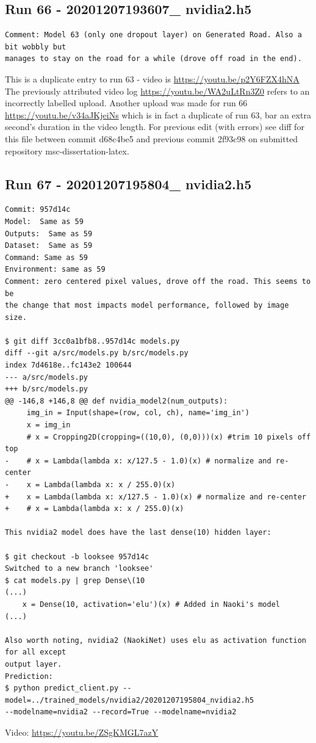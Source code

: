 \subsection{Run 66 - 20201207193607\_ nvidia2.h5}
\label{app_res:65}
\begin{verbatim}
Comment: Model 63 (only one dropout layer) on Generated Road. Also a bit wobbly but
manages to stay on the road for a while (drove off road in the end).
\end{verbatim}
This is a duplicate entry to run 63 - video is \url{https://youtu.be/p2Y6FZX4hNA}
The previously attributed video log \url{https://youtu.be/WA2uLtRn3Z0} refers to an incorrectly labelled upload. 
Another upload was made for run 66 \url{https://youtu.be/v34aJKjeiNs} which is in fact a duplicate of run 63, bar an extra second's duration in the video length.
For previous edit (with errors) see diff for this file  between commit d68c4be5 and previous commit 2f93c98 on submitted repository msc-dissertation-latex.

\subsection{Run 67 - 20201207195804\_ nvidia2.h5}
\label{app_res:XX}
\begin{verbatim}
Commit: 957d14c
Model:  Same as 59
Outputs:  Same as 59
Dataset:  Same as 59
Command: Same as 59
Environment: same as 59 
Comment: zero centered pixel values, drove off the road. This seems to be
the change that most impacts model performance, followed by image size.

$ git diff 3cc0a1bfb8..957d14c models.py
diff --git a/src/models.py b/src/models.py
index 7d4618e..fc143e2 100644
--- a/src/models.py
+++ b/src/models.py
@@ -146,8 +146,8 @@ def nvidia_model2(num_outputs):
     img_in = Input(shape=(row, col, ch), name='img_in')
     x = img_in
     # x = Cropping2D(cropping=((10,0), (0,0)))(x) #trim 10 pixels off top
-    # x = Lambda(lambda x: x/127.5 - 1.0)(x) # normalize and re-center
-    x = Lambda(lambda x: x / 255.0)(x)
+    x = Lambda(lambda x: x/127.5 - 1.0)(x) # normalize and re-center
+    # x = Lambda(lambda x: x / 255.0)(x)

This nvidia2 model does have the last dense(10) hidden layer:

$ git checkout -b looksee 957d14c
Switched to a new branch 'looksee'
$ cat models.py | grep Dense\(10
(...)
    x = Dense(10, activation='elu')(x) # Added in Naoki's model
(...)

Also worth noting, nvidia2 (NaokiNet) uses elu as activation function for all except
output layer.
Prediction:
$ python predict_client.py --model=../trained_models/nvidia2/20201207195804_nvidia2.h5
--modelname=nvidia2 --record=True --modelname=nvidia2

\end{verbatim}
Video: \url{https://youtu.be/ZSgKMGL7azY}

